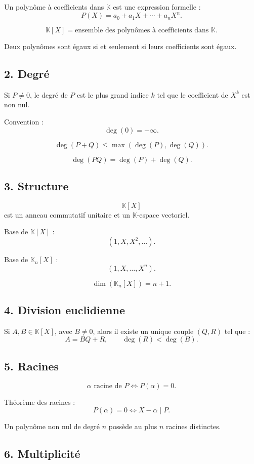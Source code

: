 \documentclass[11pt,a4paper]{article}
\newcommand{\K}{\mathbb K}
\begin{document}
Un polynôme à coefficients dans \(\K\) est une expression formelle :
\[
P(X)=a_0+a_1X+\cdots+a_nX^n.
\]

\[
\K[X]=\text{ensemble des polynômes à coefficients dans }\K.
\]

Deux polynômes sont égaux si et seulement si leurs coefficients sont égaux.

\subsection*{2. Degré}

Si \(P\neq0\), le degré de \(P\) est le plus grand indice \(k\) tel que le coefficient de \(X^k\) est non nul.

Convention :
\[
\deg(0)=-\infty.
\]

\[
\deg(P+Q)\leq\max(\deg(P),\deg(Q)).
\]

\[
\deg(PQ)=\deg(P)+\deg(Q).
\]

\subsection*{3. Structure}

\[
\K[X]
\]
est un anneau commutatif unitaire et un \(\K\)-espace vectoriel.

Base de \(\K[X]\) :
\[
(1,X,X^2,\dots).
\]

Base de \(\K_n[X]\) :
\[
(1,X,\dots,X^n).
\]

\[
\dim(\K_n[X])=n+1.
\]

\subsection*{4. Division euclidienne}

Si \(A,B\in\K[X]\), avec \(B\neq0\), alors il existe un unique couple \((Q,R)\) tel que :
\[
A=BQ+R,
\qquad
\deg(R)<\deg(B).
\]

\subsection*{5. Racines}

\[
\alpha\text{ racine de }P
\Longleftrightarrow
P(\alpha)=0.
\]

Théorème des racines :
\[
P(\alpha)=0
\Longleftrightarrow
X-\alpha\mid P.
\]

Un polynôme non nul de degré \(n\) possède au plus \(n\) racines distinctes.

\subsection*{6. Multiplicité}
\end{document}
